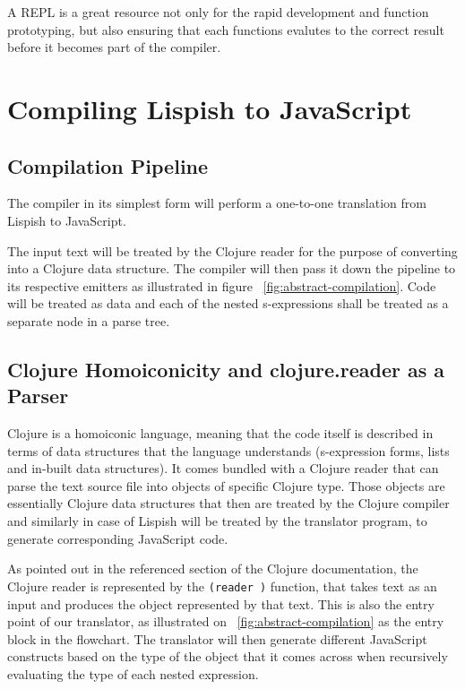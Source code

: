 A REPL is a great resource not only for the rapid development and function prototyping, but also ensuring that each functions evalutes to the correct result before it becomes part of the compiler.

\section{Compiling Lispish to JavaScript}

\subsection{Compilation Pipeline}

The compiler in its simplest form will perform a one-to-one translation from Lispish to JavaScript. 

The input text will be treated by the Clojure reader for the purpose of converting into a Clojure data structure. The compiler will then pass it down the pipeline to its respective emitters as illustrated in figure ~\ref{fig:abstract-compilation}. Code will be treated as data and each of the nested s-expressions shall be treated as a separate node in a parse tree.




\subsection{Clojure Homoiconicity and clojure.reader as a Parser}
Clojure is a homoiconic language, meaning that the code itself is described in terms of data structures that the language understands (s-expression forms, lists and in-built data structures). It comes bundled with a Clojure reader \cite{clojure.reader} that can parse the text source file into objects of specific Clojure type. Those objects are essentially Clojure data structures that then are treated by the Clojure compiler and similarly in case of Lispish will be treated by the translator program, to generate corresponding JavaScript code. 

As pointed out in the referenced \cite{clojure.reader} section of the Clojure documentation, the Clojure reader is represented by the \texttt{(reader )} function, that takes text as an input and produces the object represented by that text. 
This is also the entry point of our translator, as illustrated on ~\ref{fig:abstract-compilation} as the entry block in the flowchart. 
The translator will then generate different JavaScript constructs based on the type of the object that it comes across when recursively evaluating the type of each nested expression. 
